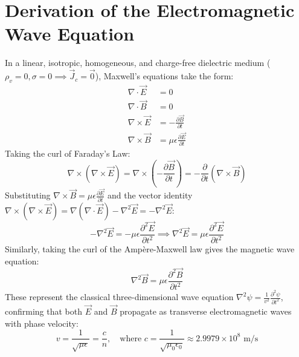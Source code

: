 \section{Derivation of the Electromagnetic Wave Equation}
In a linear, isotropic, homogeneous, and charge-free dielectric medium ($\rho_v = 0, \sigma = 0 \implies \vec{J}_c = \vec{0}$), Maxwell's equations take the form:
\begin{align}
\nabla \cdot \vec{E} &= 0 \\
\nabla \cdot \vec{B} &= 0 \\
\nabla \times \vec{E} &= -\frac{\partial \vec{B}}{\partial t} \\
\nabla \times \vec{B} &= \mu\epsilon \frac{\partial \vec{E}}{\partial t}
\end{align}
Taking the curl of Faraday's Law:
\begin{equation}
\nabla \times (\nabla \times \vec{E}) = \nabla \times \left( -\frac{\partial \vec{B}}{\partial t} \right) = -\frac{\partial}{\partial t}(\nabla \times \vec{B})
\end{equation}
Substituting $\nabla \times \vec{B} = \mu\epsilon \frac{\partial \vec{E}}{\partial t}$ and the vector identity $\nabla \times (\nabla \times \vec{E}) = \nabla(\nabla \cdot \vec{E}) - \nabla^2 \vec{E} = -\nabla^2 \vec{E}$:
\begin{equation}
-\nabla^2 \vec{E} = -\mu\epsilon \frac{\partial^2 \vec{E}}{\partial t^2} \implies \nabla^2 \vec{E} = \mu\epsilon \frac{\partial^2 \vec{E}}{\partial t^2}
\end{equation}
Similarly, taking the curl of the Ampère-Maxwell law gives the magnetic wave equation:
\begin{equation}
\nabla^2 \vec{B} = \mu\epsilon \frac{\partial^2 \vec{B}}{\partial t^2}
\end{equation}
These represent the classical three-dimensional wave equation $\nabla^2 \psi = \frac{1}{v^2}\frac{\partial^2 \psi}{\partial t^2}$, confirming that both $\vec{E}$ and $\vec{B}$ propagate as transverse electromagnetic waves with phase velocity:
\begin{equation}
v = \frac{1}{\sqrt{\mu\epsilon}} = \frac{c}{n}, \quad \text{where } c = \frac{1}{\sqrt{\mu_0 \epsilon_0}} \approx 2.9979 \times 10^8\text{ m/s}
\end{equation}

